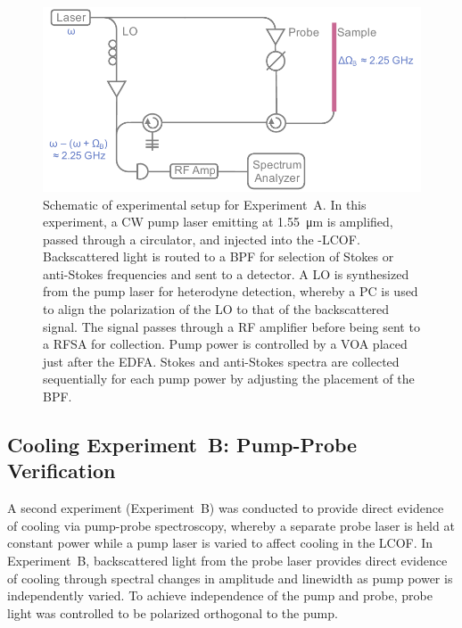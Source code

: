 \begin{figure}[t]
  \centering
  \includegraphics[width=\textwidth]{figs/2-Cooling/pumpOnlyDesign.pdf}
  \caption[Schematic of experimental setup for Experiment~A.]{Schematic of experimental setup for Experiment~A. In this experiment, a \ac{CW} pump laser emitting at \SI{1.55}{\micro\meter} is amplified, passed through a circulator, and injected into the -\ac{LCOF}. Backscattered light is routed to a \ac{BPF} for selection of Stokes or anti-Stokes frequencies and sent to a detector. A \ac{LO} is synthesized from the pump laser for heterodyne detection, whereby a \acl{PC} is used to align the polarization of the \ac{LO} to that of the backscattered signal. The signal passes through a \acl{RF} amplifier before being sent to a \ac{RFSA} for collection. Pump power is controlled by a \ac{VOA} placed just after the \ac{EDFA}. Stokes and anti-Stokes spectra are collected sequentially for each pump power by adjusting the placement of the \ac{BPF}.}
  \label{fig:Cooling:ExperimentADesign}
\end{figure}

\subsection{Cooling Experiment~B: Pump-Probe Verification}
\label{Cooling:subsec:ExperimentBPump-ProbeVerification}

A second experiment (Experiment~B) was conducted to provide direct evidence of cooling via pump-probe spectroscopy, whereby a separate probe laser is held at constant power while a pump laser is varied to affect cooling in the \ac{LCOF}. In Experiment~B, backscattered light from the probe laser provides direct evidence of cooling through spectral changes in amplitude and linewidth as pump power is independently varied. To achieve independence of the pump and probe, probe light was controlled to be polarized orthogonal to the pump.

